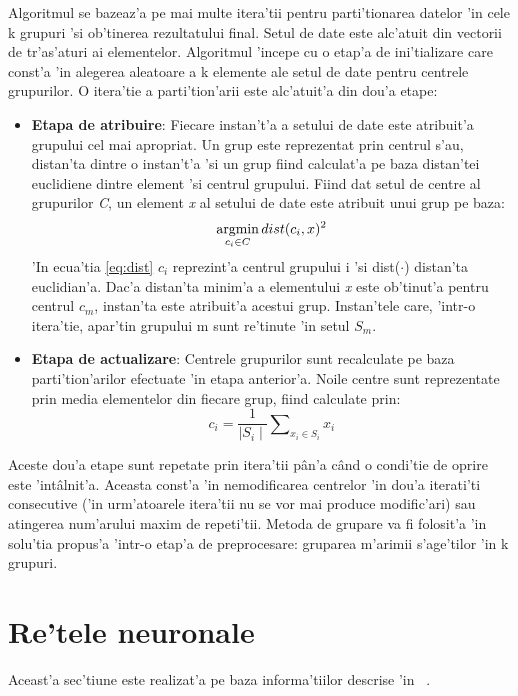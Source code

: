 \documentclass[12pt,a4paper,twoside]{report}
\newcommand{\argmin}
{\operatornamewithlimits{argmin}}
\begin{document}
Algoritmul se bazeaz'a pe mai multe itera'tii pentru parti'tionarea datelor 'in cele k grupuri 'si ob'tinerea rezultatului final. Setul de date este alc'atuit din vectorii de tr'as'aturi ai elementelor. Algoritmul 'incepe cu o etap'a de ini'tializare care const'a 'in alegerea aleatoare a k elemente ale setul de date pentru centrele grupurilor. O itera'tie a parti'tion'arii este alc'atuit'a din dou'a etape:
\begin{itemize}
\item \textbf{Etapa de atribuire}: Fiecare instan't'a a setului de date este atribuit'a grupului cel mai apropriat. Un grup este reprezentat prin centrul s'au, distan'ta dintre o instan't'a 'si un grup fiind calculat'a pe baza distan'tei euclidiene dintre element 'si centrul grupului. Fiind dat setul de centre al grupurilor \textit{C}, un element \textit{x} al setului de date este atribuit unui grup pe baza:
\begin{equation}
\argmin_{c_i \in C} dist(c_i, x)^2
\label{eq:dist}
\end{equation} 
'In ecua'tia \ref{eq:dist} $c_i$ reprezint'a centrul grupului i 'si dist($\cdot$) distan'ta euclidian'a. Dac'a distan'ta minim'a a elementului \textit{x} este ob'tinut'a pentru centrul \textit{$c_m$}, instan'ta este atribuit'a acestui grup. Instan'tele care, 'intr-o itera'tie, apar'tin grupului m sunt re'tinute 'in setul $S_m$.

\item \textbf{Etapa de actualizare}: Centrele grupurilor sunt recalculate pe baza parti'tion'arilor efectuate 'in etapa anterior'a. Noile centre sunt reprezentate prin media elementelor din fiecare grup, fiind calculate prin:
\begin{equation}
c_i = \frac{1}{\mid S_i \mid} \sum\nolimits_{x_i \in S_i} x_i
\end{equation}
\end{itemize}

Aceste dou'a etape sunt repetate prin itera'tii p\^an'a c\^and o condi'tie de oprire este 'int\^alnit'a. Aceasta const'a 'in nemodificarea centrelor 'in dou'a iterati'ti consecutive ('in urm'atoarele itera'tii nu se vor mai produce modific'ari) sau atingerea num'arului maxim de repeti'tii.  Metoda de grupare va fi folosit'a 'in solu'tia propus'a 'intr-o etap'a de preprocesare: gruparea m'arimii s'age'tilor 'in k grupuri.

\section{Re'tele neuronale}
Aceast'a sec'tiune este realizat'a pe baza informa'tiilor descrise 'in ~\cite{nn}.
\end{document}
